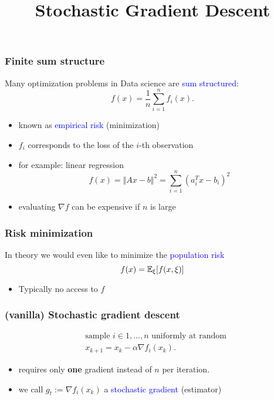 \documentclass{beamer}
\title{Stochastic Gradient Descent}
\begin{document}
\maketitle


\begin{frame}
  \frametitle{Finite sum structure}

  Many optimization problems in Data science are \textcolor{blue}{sum structured}:
  \begin{equation}
    f(x) = \frac{1}{n} \sum_{i=1}^{n} f_i(x).
  \end{equation}

  \begin{itemize}
    \item known as \textcolor{blue}{empirical risk} (minimization)
    \item $f_i$ corresponds to the loss of the $i$-th observation
    \item for example: linear regression
          \begin{equation}
            f(x) = \Vert Ax-b \Vert^2 = \sum_{i=1}^{n} {(a_i^T x -b_i)}^2
          \end{equation}
    \item evaluating $\nabla f$ can be expensive if $n$ is large
  \end{itemize}
  
\end{frame}


\begin{frame}
  \frametitle{Risk minimization}
  In theory we would even like to minimize the \textcolor{blue}{population risk}
  \begin{equation}
    f(x) = \mathbb{E}_\xi [ f(x, \xi) ]
  \end{equation}
  \begin{itemize}
    \item Typically no access to $f$
  \end{itemize}

\end{frame}


\begin{frame}
  \frametitle{(vanilla) Stochastic gradient descent}

  \begin{block}{}
    \begin{align}
      &\text{sample $i\in 1,\dots, n$ uniformly at random} \\
      &x_{k+1} = x_k - \alpha \nabla f_i(x_k).
    \end{align}
  \end{block}

  \begin{itemize}
    \item requires only \textbf{one} gradient instead of $n$ per iteration.
    \item we call $g_t := \nabla f_i(x_k)$ a \textcolor{blue}{stochastic gradient} (estimator)
  \end{itemize}

\end{frame}
\end{document}
